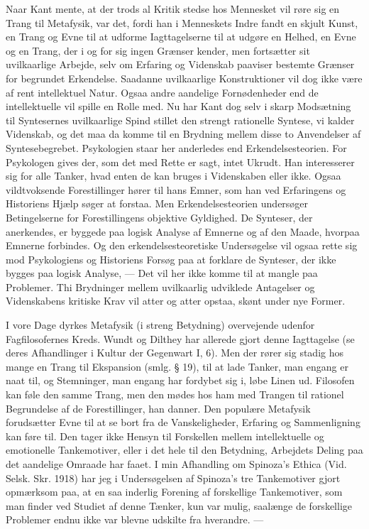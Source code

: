 \documentclass[12pt]{article}
\newcommand{\apage}[1]{\marginnote{\footnotesize\textit{[#1]}}}
\begin{document}
Naar Kant mente, at der trods al Kritik stedse hos Mennesket vil røre sig en
Trang til Metafysik, var det, fordi han i Menneskets Indre fandt
\guillemotright{}en skjult Kunst\guillemotleft{}, en Trang og Evne til at
udforme Iagttagelserne til at udgøre en Helhed, en Evne og en Trang, der i og
for sig ingen Grænser kender, men fortsætter sit uvilkaarlige Arbejde, selv om
Erfaring og Videnskab paaviser bestemte Grænser for begrundet Erkendelse.
Saadanne uvilkaarlige Konstruktioner vil dog ikke være af rent intellektuel
Natur. Ogsaa andre aandelige Fornødenheder end de intellektuelle vil spille en
Rolle med. Nu har Kant dog selv i skarp Modsætning til Syntesernes uvilkaarlige
Spind stillet den strengt rationelle Syntese, vi kalder Videnskab, og det maa
da komme til en Brydning mellem disse to Anvendelser af Syntesebegrebet.
Psykologien staar her anderledes end Erkendelsesteorien. For Psykologen gives
der, som det med Rette er sagt, intet Ukrudt. Han interesserer sig for alle
Tanker, hvad enten de kan bruges i Videnskaben eller ikke. Ogsaa vildtvoksende
Forestillinger hører til hans Emner, som han ved Erfaringens og Historiens
Hjælp søger at forstaa. Men Erkendelsesteorien undersøger
\setcounter{footnote}{0}%
\apage{98}Betingelserne for Forestillingens objektive Gyldighed. De Synteser,
der anerkendes, er byggede paa logisk Analyse af Emnerne og af den Maade,
hvorpaa Emnerne forbindes. Og den erkendelsesteoretiske Undersøgelse vil ogsaa
rette sig mod Psykologiens og Historiens Forsøg paa at forklare de Synteser,
der ikke bygges paa logisk Analyse, --- Det vil her ikke komme til at mangle
paa Problemer. Thi Brydninger mellem uvilkaarlig udviklede Antagelser og
Videnskabens kritiske Krav vil atter og atter opstaa, skønt under nye Former.

I vore Dage dyrkes Metafysik (i streng Betydning) overvejende udenfor
Fagfilosofernes Kreds. Wundt og Dilthey har allerede gjort denne Iagttagelse
(se deres Afhandlinger i \guillemotright{}Kultur der Gegenwart\guillemotleft{}
I, 6). Men der rører sig stadig hos mange en Trang til Ekspansion (smlg. § 19),
til at lade Tanker, man engang er naat til, og Stemninger, man engang har
fordybet sig i, løbe Linen ud. Filosofen kan føle den samme Trang, men den
mødes hos ham med Trangen til rationel Begrundelse af de Forestillinger, han
danner. Den populære Metafysik forudsætter Evne til at se bort fra de
Vanskeligheder, Erfaring og Sammenligning kan føre til. Den tager ikke Hensyn
til Forskellen mellem intellektuelle og emotionelle Tankemotiver, eller i det
hele til den Betydning, Arbejdets Deling paa det aandelige Omraade har faaet. I
min Afhandling om Spinoza's Ethica (Vid. Selsk. Skr. 1918) har jeg i
Undersøgelsen af Spinoza's tre Tankemotiver gjort opmærksom paa, at en saa
inderlig Forening af forskellige Tankemotiver, som man finder ved Studiet af
denne Tænker, kun var mulig, saalænge de forskellige Problemer endnu ikke var
blevne udskilte fra hverandre. ---
\end{document}
